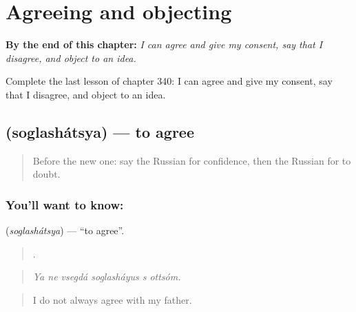 
\chapter{Agreeing and objecting}
\label{ch:ru-agreeing-and-objecting}

\begin{chapteropening}
\textbf{By the end of this chapter:} \emph{I can agree and give my consent, say that I disagree, and object to an idea.}

Complete the last lesson of chapter 340: I can agree and give my consent, say that I disagree, and object to an idea.
\end{chapteropening}

\section[\texorpdfstring{\ru{соглашаться} (soglashátsya)}{соглашаться (soglashátsya)}]{ (soglashátsya) — to agree}

\label{lesson:RU-C340-soglashatsya}



\begin{quote}
Before the new one: say the Russian for confidence, then the Russian for to doubt.
\end{quote}

\subsection*{You'll want to know: }
\textbf{} (\emph{soglashátsya}) — \textquotedblleft{}to agree\textquotedblright{}.

\begin{quote}
     .
\end{quote}

\begin{quote}
\emph{Ya ne vsegdá soglasháyus s ottsóm.}
\end{quote}

\begin{quote}
I do not always agree with my father.
\end{quote}

